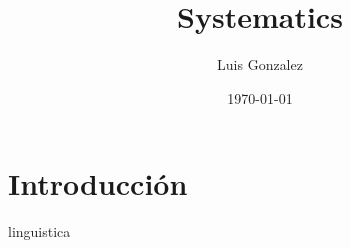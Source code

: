 \documentclass[12pt]{article}
\title{Systematics}
\author{Luis Gonzalez}
\date{\today}
\begin{document}
\maketitle

\section{Introducción}

linguistica 
\end{document}
